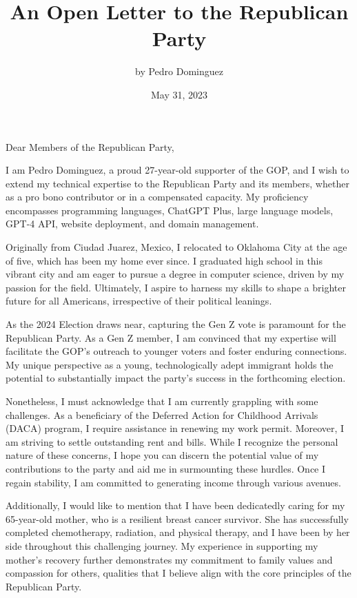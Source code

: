 \documentclass[12pt]{article}
\title{An Open Letter to the Republican Party}
\author{by Pedro Dominguez}
\date{May 31, 2023} %
\begin{document}
\maketitle %

Dear Members of the Republican Party,

\vspace{1em} %

I am Pedro Dominguez, a proud 27-year-old supporter of the GOP, and I wish to extend my technical expertise to the Republican Party and its members, whether as a pro bono contributor or in a compensated capacity. My proficiency encompasses programming languages, ChatGPT Plus, large language models, GPT-4 API, website deployment, and domain management.

Originally from Ciudad Juarez, Mexico, I relocated to Oklahoma City at the age of five, which has been my home ever since. I graduated high school in this vibrant city and am eager to pursue a degree in computer science, driven by my passion for the field. Ultimately, I aspire to harness my skills to shape a brighter future for all Americans, irrespective of their political leanings.

As the 2024 Election draws near, capturing the Gen Z vote is paramount for the Republican Party. As a Gen Z member, I am convinced that my expertise will facilitate the GOP’s outreach to younger voters and foster enduring connections. My unique perspective as a young, technologically adept immigrant holds the potential to substantially impact the party’s success in the forthcoming election.

Nonetheless, I must acknowledge that I am currently grappling with some challenges. As a beneficiary of the Deferred Action for Childhood Arrivals (DACA) program, I require assistance in renewing my work permit. Moreover, I am striving to settle outstanding rent and bills. While I recognize the personal nature of these concerns, I hope you can discern the potential value of my contributions to the party and aid me in surmounting these hurdles. Once I regain stability, I am committed to generating income through various avenues.

Additionally, I would like to mention that I have been dedicatedly caring for my 65-year-old mother, who is a resilient breast cancer survivor. She has successfully completed chemotherapy, radiation, and physical therapy, and I have been by her side throughout this challenging journey. My experience in supporting my mother’s recovery further demonstrates my commitment to family values and compassion for others, qualities that I believe align with the core principles of the Republican Party.
\end{document}
